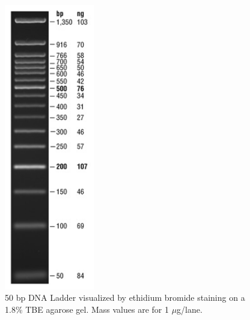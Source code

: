 \documentclass{tufte-book} %
\begin{document}
\begin{figure}[h]
  \centering
      \includegraphics[width=0.35\textwidth]{N3236_thumb}
  \caption{50 bp DNA Ladder visualized by ethidium bromide staining on a 1.8\% TBE agarose gel. Mass values are for 1 $\mu$g/lane.}
\end{figure}
\end{document}
